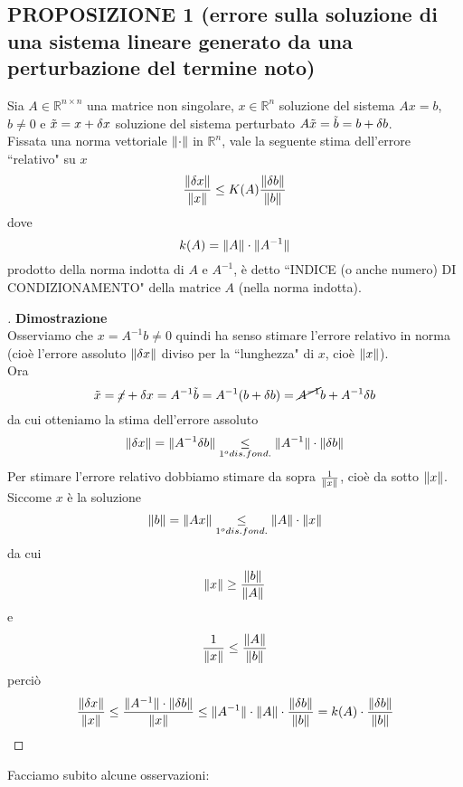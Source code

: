 \documentclass[12pt,a4paper]{article}
\DeclarePairedDelimiter{\norma}{\lVert}{\rVert}
\begin{document}
\subsection{PROPOSIZIONE 1 (errore sulla soluzione di una sistema lineare generato da una perturbazione del termine noto)}
Sia $A \in \mathbb{R}^{n\times n}$ una matrice non singolare, $x \in \mathbb{R}^n$ soluzione del sistema $Ax=b$, $b \neq 0$ e $\Tilde{x}=x+\delta x$ soluzione del sistema perturbato $A\Tilde{x}=\Tilde{b}=b+\delta b$.\\
Fissata una norma vettoriale $\norma{\cdot}$ in $\mathbb{R}^n$, vale la seguente stima dell'errore ``relativo" su $x$
\begin{equation*}
    \frac{\norma{\delta x}}{\norma{x}} \leq K(A) \frac{\norma{\delta b}}{\norma{b}}
\end{equation*}
dove 
\begin{equation*}
    k(A)=\norma{A}\cdot\norma{A^{-1}}
\end{equation*}
prodotto della norma indotta di $A$ e $A^{-1}$, è detto ``INDICE (o anche numero) DI CONDIZIONAMENTO" della matrice $A$ (nella norma indotta).\\
\begin{proof}[\unskip\nopunct]
\textbf{Dimostrazione}\\Osserviamo che $x=A^{-1}b\neq0$ quindi ha senso stimare l'errore relativo in norma (cioè l'errore assoluto $\norma{\delta x}$ diviso per la ``lunghezza" di $x$, cioè $\norma{x}$). \\Ora
\begin{equation*}
    \tilde{x}=\cancel{x}+\delta x =A^{-1}\tilde{b}=A^{-1}(b+\delta b)=\cancel{A^{-1}}b+A^{-1}\delta b
\end{equation*}
da cui otteniamo la stima dell'errore assoluto
\begin{equation*}
    \norma{\delta x}=\norma{A^{-1}\delta b}\underset{1^o dis. fond.}{\leq}\norma{A^{-1}}\cdot\norma{\delta b}
\end{equation*}
Per stimare l'errore relativo dobbiamo stimare da sopra $\frac{1}{\norma{x}}$, cioè da sotto $\norma{x}$.\\Siccome $x$ è la soluzione 
\begin{equation*}
    \norma{b}=\norma{Ax}\underset{1^o dis. fond.}{\leq}\norma{A}\cdot\norma{x}
\end{equation*}
da cui
\begin{equation*}
    \norma{x}\geq\frac{\norma{b}}{\norma{A}}
\end{equation*}
e
\begin{equation*}
    \frac{1}{\norma{x}} \le \frac{\norma{A}}{\norma{b}}
\end{equation*}
perciò
\begin{equation*}
    \frac{\norma{\delta x}}{\norma{x}}\leq \frac{\norma{A^{-1}}\cdot\norma{\delta b}}{\norma{x}}\leq \norma{A^{-1}}\cdot\norma{A}\cdot\frac{\norma{\delta b}}{\norma{b}}=k(A)\cdot\frac{\norma{\delta b}}{\norma{b}}
\end{equation*}
\end{proof}
Facciamo subito alcune osservazioni:
\end{document}
